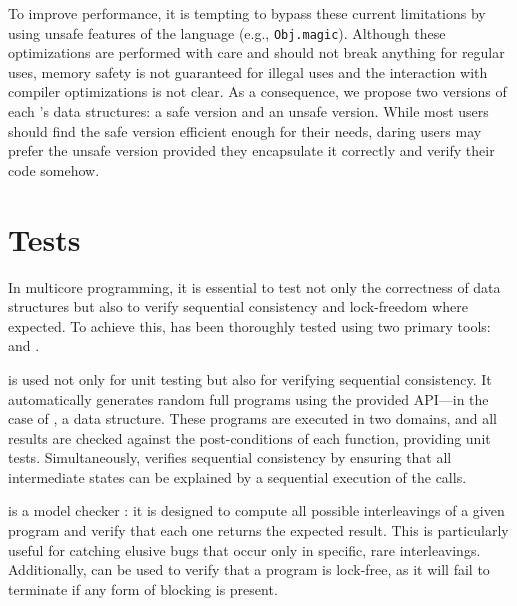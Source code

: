 \documentclass[a4paper, 11pt]{article}
\begin{document}
To improve performance, it is tempting to bypass these current limitations by using unsafe features of the language (e.g., \texttt{Obj.magic}). Although these optimizations are performed with care and should not break anything for regular uses, memory safety is not guaranteed for illegal uses and the interaction with compiler optimizations is not clear. As a consequence, we propose two versions of each \Saturn's data structures: a safe version and an unsafe version. While most users should find the safe version efficient enough for their needs, daring users may prefer the unsafe version provided they encapsulate it correctly and verify their code somehow.




\section{Tests}
In multicore programming, it is essential to test not only the correctness of data structures but also to verify sequential consistency and lock-freedom where expected. To achieve this, \Saturn has been thoroughly tested using two primary tools: \dscheck and \STM.

\STM is used not only for unit testing but also for verifying sequential consistency. It automatically generates random full programs using the provided API—in the case of \Saturn, a data structure. These programs are executed in two domains, and all results are checked against the post-conditions of each function, providing unit tests. Simultaneously, \STM verifies sequential consistency by ensuring that all intermediate states can be explained by a sequential execution of the calls.

\dscheck is a model checker : it is designed to compute all possible interleavings of a given program and verify that each one returns the expected result. This is particularly useful for catching elusive bugs that occur only in specific, rare interleavings. Additionally, \dscheck can be used to verify that a program is lock-free, as it will fail to terminate if any form of blocking is present.
\end{document}
